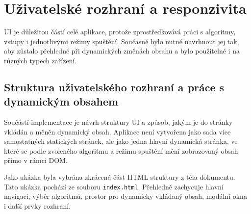\section{Uživatelské rozhraní a responzivita}
UI je důležitou částí celé aplikace, protože zprostředkovává práci s algoritmy, vstupy i jednotlivými režimy spuštění. Současně bylo nutné navrhnout jej tak, aby zůstalo přehledné při dynamických změnách obsahu a bylo použitelné i na různých typech zařízení.

\subsection{Struktura uživatelského rozhraní a práce s dynamickým obsahem}
Součástí implementace je návrh struktury UI a způsob, jakým je do stránky vkládán a měněn dynamický obsah. Aplikace není vytvořena jako sada více samostatných statických stránek, ale jako jedna hlavní dynamická stránka, ve které se podle zvoleného algoritmu a režimu spuštění mění zobrazovaný obsah přímo v rámci DOM.

Jako ukázka byla vybrána zkrácená část HTML struktury z těla dokumentu. Tato ukázka pochází ze souboru \texttt{index.html}. Přehledně zachycuje hlavní navigaci, výběr algoritmů, prostor pro dynamicky vkládaný obsah, modální okna i další prvky rozhraní.

